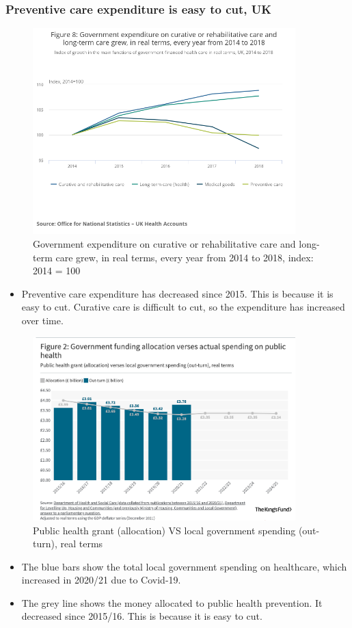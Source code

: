 \subsubsection{Preventive care expenditure is easy to cut, UK}
        \begin{figure}[H]%
                \centering
                \includegraphics[width=4in]{images/ch3/19.png}
                \caption{Government expenditure on curative or rehabilitative care and long-term care grew, in real terms, every year from 2014 to 2018, index: 2014 = 100}
            \end{figure}
\begin{itemize}           
        \item Preventive care expenditure has decreased since 2015. This is because it is easy to cut. Curative care is difficult to cut, so the expenditure has increased over time.
        \end{itemize} 

        \begin{figure}[H]%
                \centering
                \includegraphics[width=4in]{images/ch3/20.png}
                \caption{Public health grant (allocation) VS local government spending (out-turn), real terms}
            \end{figure}
\begin{itemize}           
        \item The blue bars show the total local government spending on healthcare, which increased in 2020/21 due to Covid-19.
        \item The grey line shows the money allocated to public health prevention. It decreased since 2015/16. This is because it is easy to cut. 
        \end{itemize} 
        
